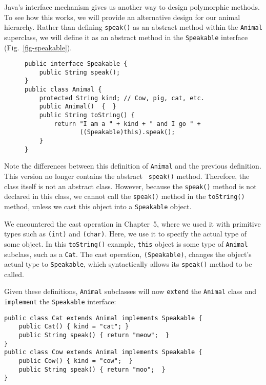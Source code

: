 Java's interface mechanism gives us another way to design polymorphic
methods. To see how this works, we will provide an alternative design
for our animal hierarchy. Rather than defining {\tt speak()} as an
abstract method within the {\tt Animal} superclass, we will define it
as an abstract method in the {\tt Speakable} interface
(Fig.~\ref{fig-speakable}).
\begin{figure}[h!]
\jjjprogstart
\begin{jjjlisting}
\begin{lstlisting}
public interface Speakable {
    public String speak();
}
public class Animal {
    protected String kind; // Cow, pig, cat, etc.
    public Animal()  {  }
    public String toString() {
        return "I am a " + kind + " and I go " + 
               ((Speakable)this).speak();
    }
}
\end{lstlisting}
\end{jjjlisting}
\end{figure}

Note the differences between this definition of {\tt Animal} and the
previous definition. This version no longer contains the abstract {\tt
speak()} method. Therefore, the class itself is not an abstract class.
However, because the {\tt speak()} method is not declared in this
class, we cannot call the {\tt speak()} method in the {\tt toString()}
method, unless we cast this object into a {\tt Speakable} object.

We encountered the cast operation in Chapter~5, where we used it with
primitive types such as {\tt (int)} and {\tt (char)}.  Here, we use it
to specify the actual type of some object.  In this {\tt toString()}
example, {\tt this} object is some type of {\tt Animal} subclass, such
as a {\tt Cat}. The cast operation, {\tt (Speakable)}, changes the
object's actual type to {\tt Speakable}, which syntactically allows
its {\tt speak()} method to be called.

Given these definitions, {\tt Animal} subclasses will now {\tt extend}
the {\tt Animal} class and {\tt implement} the {\tt Speakable}
interface:

\begin{jjjlisting}
\begin{lstlisting}
public class Cat extends Animal implements Speakable {
    public Cat() { kind = "cat"; }
    public String speak() { return "meow";  }
}
public class Cow extends Animal implements Speakable {
    public Cow() { kind = "cow";  }
    public String speak() { return "moo";  }
}
\end{lstlisting}
\end{jjjlisting}

